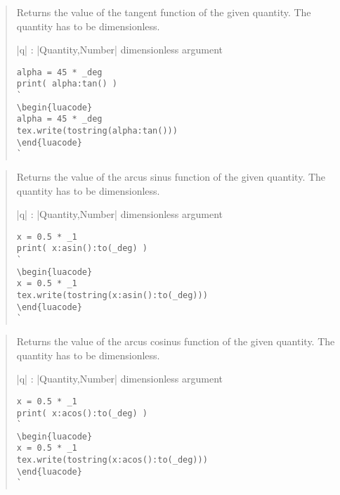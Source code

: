 \documentclass{ltxdoc}
\begin{document}
\begin{quote}
  Returns the value of the tangent function of the given quantity. The quantity has to be dimensionless.

  \begin{description}
  \item |q| : |Quantity,Number| dimensionless argument
  \end{description}

\begin{lstlisting}
alpha = 45 * _deg
print( alpha:tan() )
`
\begin{luacode}
alpha = 45 * _deg
tex.write(tostring(alpha:tan()))
\end{luacode}
`
\end{lstlisting}

\end{quote}



\begin{quote}
  Returns the value of the arcus sinus function of the given quantity. The quantity has to be dimensionless.

  \begin{description}
  \item |q| : |Quantity,Number| dimensionless argument
  \end{description}

\begin{lstlisting}
x = 0.5 * _1
print( x:asin():to(_deg) )
`
\begin{luacode}
x = 0.5 * _1
tex.write(tostring(x:asin():to(_deg)))
\end{luacode}
`
\end{lstlisting}

\end{quote}



\begin{quote}
  Returns the value of the arcus cosinus function of the given quantity. The quantity has to be dimensionless.

  \begin{description}
  \item |q| : |Quantity,Number| dimensionless argument
  \end{description}

\begin{lstlisting}
x = 0.5 * _1
print( x:acos():to(_deg) )
`
\begin{luacode}
x = 0.5 * _1
tex.write(tostring(x:acos():to(_deg)))
\end{luacode}
`
\end{lstlisting}

\end{quote}
\end{document}
